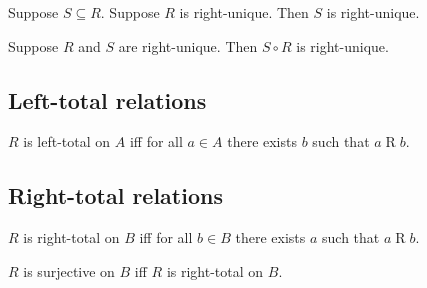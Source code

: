 \begin{proposition}\label{subseteq_of_rightunique_is_rightunique}
    Suppose $S\subseteq R$.
    Suppose $R$ is right-unique.
    Then $S$ is right-unique.
\end{proposition}

\begin{proposition}\label{circ_rightunique}
    Suppose $R$ and $S$ are right-unique.
    Then $S\circ R$ is right-unique.
\end{proposition}



\subsection{Left-total relations}

\begin{definition}\label{lefttotal}
    $R$ is left-total on $A$ iff
    for all $a\in A$ there exists $b$ such that $a\mathrel{R} b$.
\end{definition}


\subsection{Right-total relations}

\begin{definition}\label{righttotal}
    $R$ is right-total on $B$ iff
    for all $b\in B$ there exists $a$ such that $a\mathrel{R} b$.
\end{definition}

\begin{abbreviation}\label{surjective}
    $R$ is surjective on $B$ iff $R$ is right-total on $B$.
\end{abbreviation}
